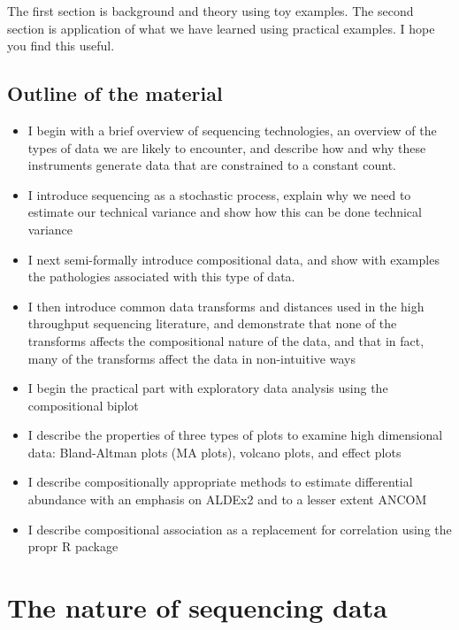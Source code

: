\documentclass[onecolumn]{book}
\providecommand{\tightlist}{%
  \setlength{\itemsep}{0pt}\setlength{\parskip}{0pt}}
\theoremstyle{definition}
\theoremstyle{definition}
\theoremstyle{definition}
\theoremstyle{remark}
\begin{document}
The first section is background and theory using toy examples. The
second section is application of what we have learned using practical
examples. I hope you find this useful.

\hypertarget{outline-of-the-material}{%
\section{Outline of the material}\label{outline-of-the-material}}

\begin{itemize}
\tightlist
\item
  I begin with a brief overview of sequencing technologies, an overview
  of the types of data we are likely to encounter, and describe how and
  why these instruments generate data that are constrained to a constant
  count.
\item
  I introduce sequencing as a stochastic process, explain why we need to
  estimate our technical variance and show how this can be done
  technical variance
\item
  I next semi-formally introduce compositional data, and show with
  examples the pathologies associated with this type of data.
\item
  I then introduce common data transforms and distances used in the high
  throughput sequencing literature, and demonstrate that none of the
  transforms affects the compositional nature of the data, and that in
  fact, many of the transforms affect the data in non-intuitive ways
\item
  I begin the practical part with exploratory data analysis using the
  compositional biplot
\item
  I describe the properties of three types of plots to examine high
  dimensional data: Bland-Altman plots (MA plots), volcano plots, and
  effect plots
\item
  I describe compositionally appropriate methods to estimate
  differential abundance with an emphasis on ALDEx2 and to a lesser
  extent ANCOM
\item
  I describe compositional association as a replacement for correlation
  using the propr R package
\end{itemize}

\hypertarget{sequencing}{%
\chapter{The nature of sequencing data}\label{sequencing}}
\end{document}
